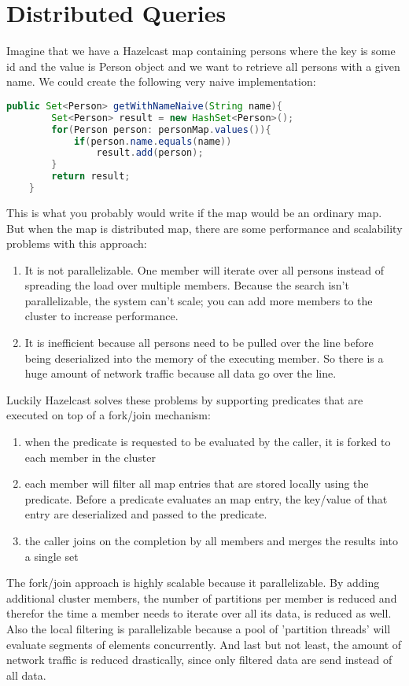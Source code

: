 \section{Distributed Queries}
Imagine that we have a Hazelcast map containing persons where the key is some id and the value is Person object and we want to retrieve all persons with a given name. We could create the following very naive implementation:
\begin{lstlisting}[language=java]
   public Set<Person> getWithNameNaive(String name){
        Set<Person> result = new HashSet<Person>();
        for(Person person: personMap.values()){
            if(person.name.equals(name))
                result.add(person);
        }
        return result;
    }
\end{lstlisting}
This is what you probably would write if the map would be an ordinary map. But when the map is distributed map, there are some performance and scalability problems with this approach:
\begin{enumerate}
\item It is not parallelizable. One member will iterate over all persons instead of spreading the load over multiple members. Because the search isn't parallelizable, the system can't scale; you can add more members to the cluster to increase performance.
\item It is inefficient because all persons need to be pulled over the line before being deserialized into the memory of the executing member. So there is a huge amount of network traffic because all data go over the line.
\end{enumerate}

Luckily Hazelcast solves these problems by supporting predicates that are executed on top of a fork/join mechanism:
\begin{enumerate}
\item when the predicate is requested to be evaluated by the caller, it is forked to each member in the cluster
\item each member will filter all map entries that are stored locally using the predicate. Before a predicate evaluates an map entry, the key/value of that entry are deserialized and passed to the predicate. 
\item the caller joins on the completion by all members and merges the results into a single set
\end{enumerate}
The fork/join approach is highly scalable because it parallelizable. By adding additional cluster members, the number of partitions per member is reduced and therefor the time a member needs to iterate over all its data, is reduced as well. Also the local filtering is parallelizable because a pool of 'partition threads' will evaluate segments of elements concurrently. And last but not least, the amount of network traffic is reduced drastically, since only filtered data are send instead of all data.

